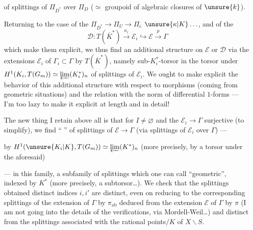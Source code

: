 

of splittings of $\Pi_{D^*}$  over $\Pi_D$ ($\simeq$ groupoid of algebraic closures of $\unsure{k}$).

Returning to the case of the  $\Pi_{D^*}\to\Pi_U\to\Pi_e$ $\unsure{\kappa|K}\ldots$, and of the 
\[
\mathcal{D}:T(\overline{K}^*)\xrightarrow{\kappa_i}\mathcal{E}_i\hookrightarrow\mathcal{E}\xrightarrow{p}\Gamma
\]
which make them explicit, we thus find an additional structure on $\mathcal{E}$ or $\mathcal{D}$ via  the extensions $\mathcal{E}_i$ of $\Gamma_i\subset\Gamma$ by $T(\overline{K}^*)$, namely   sub-$K_i^*$-torsor in the torsor under
$H^1(K_i,T(G_m))\simeq\varprojlim(K_i^*)_n$ of  splittings of $\mathcal{E}_i$.
We ought to make explicit the behavior of this additional structure with respect to morphisms (coming from geometric situations) and the relation with the norm of differential $1$-forms --- I'm too lazy to make it explicit at length and in detail!

The new thing I retain above all is that for $I\ne\varnothing$ and the $\mathcal{E}_i\to\Gamma$ surjective (to simplify), we find   `` '' of splittings of $\mathcal{E}\to\Gamma$ (via splittings of $\mathcal{E}_i$ over $\Gamma$) ---  



by $H^1(\unsure{K_i|K},T(G_m))\simeq\varprojlim(K^*)_n$ (more precisely, by a torsor under the aforesaid)

--- in this family, a subfamily of splittings which one can call ``geometric'', indexed by $K^*$ (more precisely, a subtorsor\ldots).
We check that the splittings obtained  distinct indices $i,i'$ are distinct, even on reducing to the corresponding \unsure{$\pi$-}splittings of the extension of $\Gamma$ by $\pi_{\mathrm{ab}}$ deduced from the extension $\mathcal{E}$ of $\Gamma$ by $\pi$ (I am not going into the details of the verifications, via Mordell-Weil\ldots) and distinct from the splittings associated with the rational points$/K$ of $X\backslash S$.


